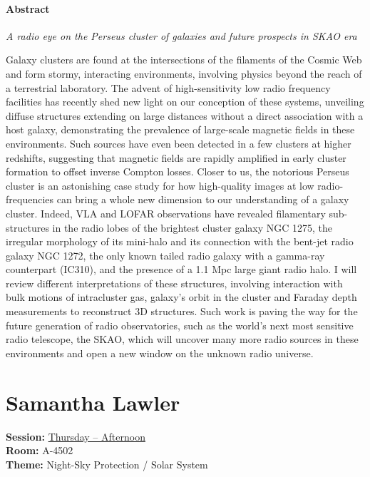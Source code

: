 \paragraph{Abstract}
{\itshape
A radio eye on the Perseus cluster of galaxies and future prospects in SKAO era

Galaxy clusters are found at the intersections of the filaments of the Cosmic Web and form stormy, interacting environments, involving physics beyond the reach of a terrestrial laboratory. The advent of high-sensitivity low radio frequency facilities has recently shed new light on our conception of these systems, unveiling diffuse structures extending on large distances without a direct association with a host galaxy, demonstrating the prevalence of large-scale magnetic fields in these environments. Such sources have even been detected in a few clusters at higher redshifts, suggesting that magnetic fields are rapidly amplified in early cluster formation to offset inverse Compton losses. Closer to us, the notorious Perseus cluster is an astonishing case study for how high-quality images at low radio-frequencies can bring a whole new dimension to our understanding of a galaxy cluster. Indeed, VLA and LOFAR observations have revealed filamentary sub-structures in the radio lobes of the brightest cluster galaxy NGC 1275, the irregular morphology of its mini-halo and its connection with the bent-jet radio galaxy NGC 1272, the only known tailed radio galaxy with a gamma-ray counterpart (IC310), and the presence of a 1.1 Mpc large giant radio halo. I will review different interpretations of these structures, involving interaction with bulk motions of intracluster gas, galaxy's orbit in the cluster and Faraday depth measurements to reconstruct 3D structures. Such work is paving the way for the future generation of radio observatories, such as the world's next most sensitive radio telescope, the SKAO, which will uncover many more radio sources in these environments and open a new window on the unknown radio universe.
}

\hypertarget{invited-samantha-lawler}{}
\label{invited-page-samantha-lawler}
\section{Samantha Lawler}
\textbf{Session:} \hyperlink{schedule-thursday-afternoon-a-4502}{Thursday -- Afternoon}\\
\textbf{Room:} A-4502\\
\textbf{Theme:} Night-Sky Protection / Solar System\\

